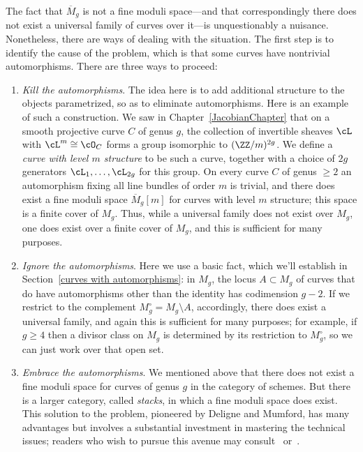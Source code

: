 The fact that $\overline M_g$ is not a fine moduli space---and that correspondingly there does not exist a universal family of curves over it---is unquestionably a nuisance. Nonetheless, there are ways of dealing with the situation. The first step is to identify the cause of the problem, which is that some curves have nontrivial automorphisms. There are three ways to proceed:

\begin{enumerate}
\item \emph{Kill the automorphisms}. The idea here is to add additional structure to the objects parametrized, so as to eliminate automorphisms. Here is an example of such a construction. We saw in Chapter~\ref{JacobianChapter} that on a smooth projective curve $C$ of genus $g$, the collection of invertible sheaves $\cL$ with $\cL^m \cong \cO_C$ forms a group isomorphic to $(\ZZ/m)^{2g}$. We define a \emph{curve with level $m$ structure} to be such a curve, together with a choice of $2g$ generators $\cL_1,\dots,\cL_{2g}$ for this group. On every curve $C$ of genus $\geq 2$ an automorphism fixing all line bundles of order $m$ is trivial,  and there does 
exist a fine moduli space $\overline M_g[m]$ for curves with level $m$ structure; this space is a finite cover of $M_g$. Thus, while a universal family does not exist over $M_g$, one does exist over a finite cover of $M_g$, and this is sufficient for many purposes.

\item \emph {Ignore the automorphisms}.
Here we use a basic fact, which we'll establish in Section~\ref{curves with automorphisms}: in $M_g$, the locus $A \subset M_g$ of curves that do have automorphisms other than the identity has codimension $g-2$. If we restrict to the complement $M_g^\circ = M_g \setminus A$, accordingly, there does exist a universal family, and again this is sufficient for many purposes; for example, if $g \geq 4$ then a divisor class on $M_g$ is determined by its restriction to $M_g^\circ$, so we can just work over that open set.

\item \emph{Embrace the automorphisms}. We mentioned above that there does not exist a fine moduli space for curves of genus $g$ in the category of schemes. But there is a larger category, called \emph{stacks}, in which a fine moduli space does exist. This solution to the problem, pioneered by Deligne and Mumford, has
many advantages but involves a substantial investment in mastering the technical issues; readers who wish to pursue this avenue may consult~\cite{Deligne-Mumford} or~\cite{Olsson}.
\end{enumerate} 

